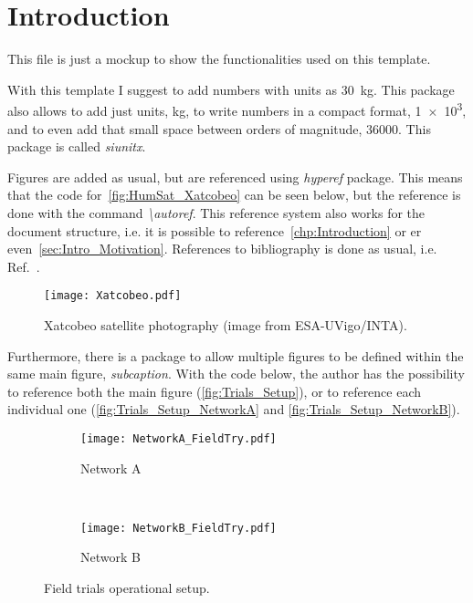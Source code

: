 %
%
%


\chapter{Introduction}
\label{chp:Introduction}

This file is just a mockup to show the functionalities used on this template.

With this template I suggest to add numbers with units as \SI{30}{kg}.
This package also allows to add just units, \si{kg}, to write numbers in a compact format, \num{1e3}, and to even add that small space between orders of magnitude, \num{36000}.
This package is called \emph{siunitx}.

Figures are added as usual, but are referenced using \emph{hyperef} package.
This means that the code for~\autoref{fig:HumSat_Xatcobeo} can be seen below, but the reference is done with the command \emph{\textbackslash{}autoref}.
This reference system also works for the document structure, i.e. it is possible to reference~\autoref{chp:Introduction} or er even~\autoref{sec:Intro_Motivation}.
References to bibliography is done as usual, i.e. Ref.~\cite{Guerra2016}.
%
\begin{figure}[!htb]
    \centering
    \texttt{[image: Xatcobeo.pdf]} %
    \caption{Xatcobeo satellite photography (image from ESA-UVigo/INTA).}
    \label{fig:HumSat_Xatcobeo}
\end{figure}

Furthermore, there is a package to allow multiple figures to be defined within the same main figure, \emph{subcaption}.
With the code below, the author has the possibility to reference both the main figure (\autoref{fig:Trials_Setup}), or to reference each individual one (\autoref{fig:Trials_Setup_NetworkA} and \autoref{fig:Trials_Setup_NetworkB}).
%
\begin{figure}[!htb]
    \centering
    \begin{subfigure}[b]{0.48\textwidth}
        \centering
        \texttt{[image: NetworkA\_FieldTry.pdf]} %
        \caption{Network A}
        \label{fig:Trials_Setup_NetworkA}
    \end{subfigure}
    \\ %
    \begin{subfigure}[b]{0.48\textwidth}
        \centering
        \texttt{[image: NetworkB\_FieldTry.pdf]} %
        \caption{Network B}
        \label{fig:Trials_Setup_NetworkB}
    \end{subfigure}
    \caption{Field trials operational setup.}
    \label{fig:Trials_Setup}
\end{figure}

